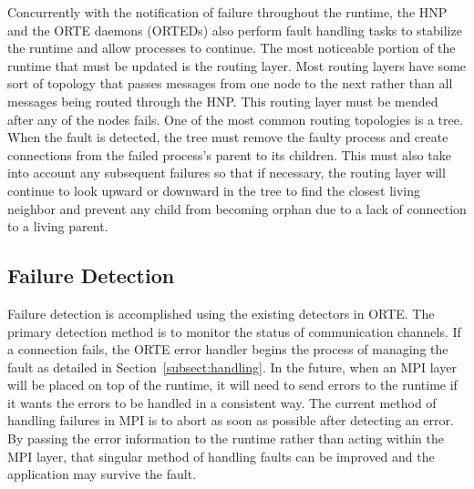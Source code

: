 \documentclass{llncs}
\begin{document}
Concurrently with the notification of failure throughout the runtime,
the HNP and the ORTE daemons (ORTEDs) also perform fault handling tasks to stabilize
the runtime and allow processes to continue. The most noticeable
portion of the runtime that must be updated is the routing layer. Most
routing layers have some sort of topology that passes messages from
one node to the next rather than all messages being routed through the
HNP. This routing layer must be mended after any of the nodes fails.
One of the most common routing topologies is a tree. When the fault is
detected, the tree must remove the faulty process and create
connections from the failed process's parent to its children. This
must also take into account any subsequent failures so that if
necessary, the routing layer will continue to look upward or downward
in the tree to find the closest living neighbor and prevent any child
from becoming orphan due to a lack of connection to a living parent.

\subsection{Failure Detection}
\label{subsect:detection}

Failure detection is accomplished using the existing detectors in
ORTE. The primary detection method is to monitor the status of
communication channels. If a connection fails, the ORTE error handler
begins the process of managing the fault as detailed in
Section~\ref{subsect:handling}. In the future, when an MPI layer will
be placed on top of the runtime, it will need to send errors to the
runtime if it wants the errors to be handled in a consistent way. The
current method of handling failures in MPI is to abort as soon as
possible after detecting an error. By passing the error information to
the runtime rather than acting within the MPI layer, that singular
method of handling faults can be improved and the application may
survive the fault.

\end{document}
